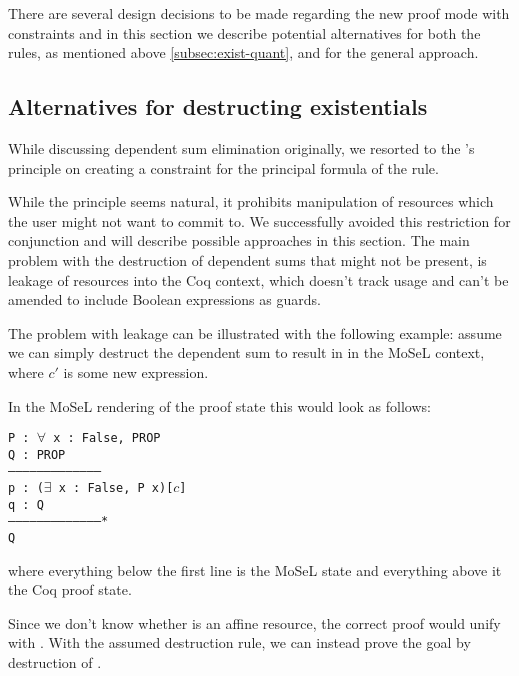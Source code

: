 There are several design decisions to be made regarding the new proof mode with constraints and in this section we describe potential alternatives for both the rules, as mentioned above \ref{subsec:exist-quant}, and for the general approach.

\subsection{Alternatives for destructing existentials}
\label{subsec:design_decisions_existential}

While discussing dependent sum elimination originally, we resorted to the \citeauthor{harlandResourceDistributionBooleanConstraints2003}'s principle on creating a constraint for the principal formula of the rule.

While the principle seems natural, it prohibits manipulation of resources which the user might not want to commit to.
We successfully avoided this restriction for conjunction and will describe possible approaches in this section.
The main problem with the destruction of dependent sums that might not be present, is leakage of resources into the Coq context, which doesn't track usage and can't be amended to include Boolean expressions as guards.

The problem with leakage can be illustrated with the following example: assume we can simply destruct the dependent sum  to result in  in the MoSeL context, where \(c'\) is some new expression.

In the MoSeL rendering of the proof state this would look as follows:

\begin{minipage}{\linewidth}
\texttt{P : $\forall$ x : False, PROP\\
Q : PROP\\
---------------------------------------\\
p : ($\exists$ x : False, P x)[$c$]\\
q : Q\\
---------------------------------------*\\
Q
}
\end{minipage}

where everything below the first line is the MoSeL state and everything above it the Coq proof state.

Since we don't know whether  is an affine resource, the correct proof would unify  with \false.
With the assumed destruction rule, we can instead prove the goal by destruction of .

